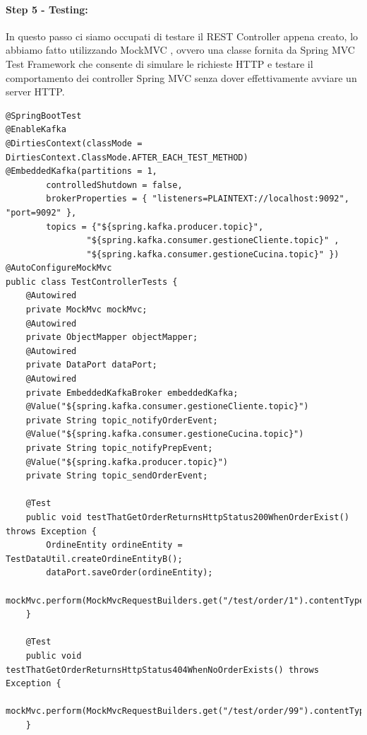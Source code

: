 \paragraph{Step 5 - Testing:}
In questo passo ci siamo occupati di testare il REST Controller appena creato, lo abbiamo fatto utilizzando MockMVC \cite{spring-mvc-test}, ovvero una classe fornita da Spring MVC Test Framework che consente di simulare le richieste HTTP e testare il comportamento dei controller Spring MVC senza dover effettivamente avviare un server HTTP.
\begin{lstlisting}[style=myJava, 
    caption={Classe Test per il REST Controller di test TestControllerTests.java}, label=lst:testrestcontrollertest, 
    emph={[2] objectMapper, mockMvc , dataPort, topic_notifyOrderEvent, topic_notifyPrepEvent, embeddedKafka, AFTER_EACH_TEST_METHOD, APPLICATION_JSON},
    emphstyle={[2]\color{codeDarkMagenta}},
    emph={[3] testThatGetOrderReturnsHttpStatus200WhenOrderExist, testThatGetOrderReturnsHttpStatus404WhenNoOrderExists, testThatGetOrderReturnsOrderWhenOrderExist  },
    emphstyle={[3]\color{codeCyan}},]
@SpringBootTest
@EnableKafka
@DirtiesContext(classMode = DirtiesContext.ClassMode.AFTER_EACH_TEST_METHOD)
@EmbeddedKafka(partitions = 1,
        controlledShutdown = false,
        brokerProperties = { "listeners=PLAINTEXT://localhost:9092", "port=9092" },
        topics = {"${spring.kafka.producer.topic}",
                "${spring.kafka.consumer.gestioneCliente.topic}" ,
                "${spring.kafka.consumer.gestioneCucina.topic}" })
@AutoConfigureMockMvc
public class TestControllerTests {
    @Autowired
    private MockMvc mockMvc;
    @Autowired
    private ObjectMapper objectMapper;
    @Autowired
    private DataPort dataPort;
    @Autowired
    private EmbeddedKafkaBroker embeddedKafka;
    @Value("${spring.kafka.consumer.gestioneCliente.topic}")
    private String topic_notifyOrderEvent;
    @Value("${spring.kafka.consumer.gestioneCucina.topic}")
    private String topic_notifyPrepEvent;
    @Value("${spring.kafka.producer.topic}")
    private String topic_sendOrderEvent;

    @Test
    public void testThatGetOrderReturnsHttpStatus200WhenOrderExist() throws Exception {
        OrdineEntity ordineEntity = TestDataUtil.createOrdineEntityB();
        dataPort.saveOrder(ordineEntity);
        mockMvc.perform(MockMvcRequestBuilders.get("/test/order/1").contentType(MediaType.APPLICATION_JSON)).andExpect(MockMvcResultMatchers.status().isOk());
    }

    @Test
    public void testThatGetOrderReturnsHttpStatus404WhenNoOrderExists() throws Exception {
        mockMvc.perform(MockMvcRequestBuilders.get("/test/order/99").contentType(MediaType.APPLICATION_JSON)).andExpect(MockMvcResultMatchers.status().isNotFound());
    }


\end{lstlisting}
